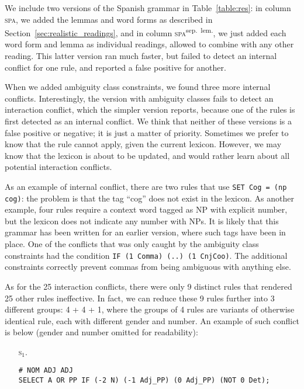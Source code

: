 {{We include two versions of the Spanish grammar in Table~\ref{table:res}: in column \textsc{spa}, we added the lemmas and word forms as described in Section~\ref{sec:realistic_readings}, and in column \textsc{spa}\textsuperscript{sep.~lem.}, we just added each word form and lemma as individual readings, allowed to combine with any other reading. 
This latter version ran much faster, but failed to detect an internal conflict for one rule, and reported a false positive for another. 

When we added ambiguity class constraints, we found three more internal conflicts.
Interestingly, the version with ambiguity classes fails to detect an interaction conflict, which the simpler version reports, because one of the rules is first detected as an internal conflict. 
We think that neither of these versions is a false positive or negative; it is just a matter of priority. Sometimes we prefer to know that the rule cannot apply, given the current lexicon. 
However, we may know that the lexicon is about to be updated, and would rather learn about all potential interaction conflicts.

As an example of internal conflict, there are two rules that use \texttt{SET Cog = (np cog)}: the problem is that the tag ``cog'' does not exist in the lexicon. As another example, four rules require a context word tagged as NP with explicit number, but the lexicon does not indicate any number with NPs. It is likely that this grammar has been written for an earlier version, where such tags have been in place.
One of the conflicts that was only caught by the ambiguity class constraints had the condition \texttt{IF (1 Comma) (..) (1 CnjCoo)}. The additional constraints correctly prevent commas from being ambiguous with anything else.

As for the 25 interaction conflicts, there were only 9 distinct rules that rendered 25 other rules ineffective.
In fact, we can reduce these 9 rules further into 3 different groups: 4 + 4 + 1, where the groups of 4 rules are variants of otherwise identical rule, each with different gender and number.
An example of such conflict is below (gender and number omitted for readability):

\begin{itemize}
\item[\textsc{s$_{1}$.}] 
\begin{verbatim}
# NOM ADJ ADJ
SELECT A OR PP IF (-2 N) (-1 Adj_PP) (0 Adj_PP) (NOT 0 Det);


\end{verbatim}
\end{itemize}}}
